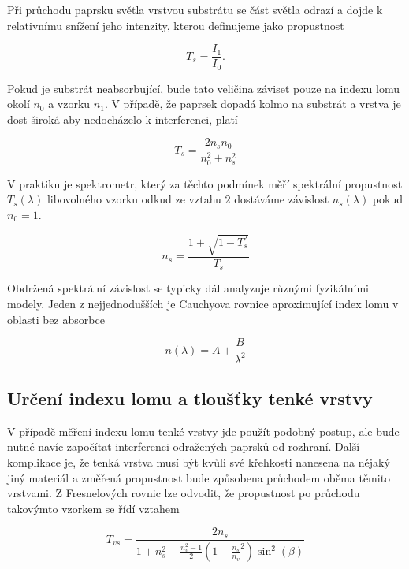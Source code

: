 \documentclass[a4paper,11pt]{article}
\begin{document}
Při průchodu paprsku světla vrstvou substrátu se část světla odrazí a dojde k relativnímu snížení jeho intenzity, kterou definujeme jako propustnost

\begin{equation}
T_s = \frac{I_1}{I_0}.
\end{equation}

Pokud je substrát neabsorbující, bude tato veličina záviset pouze na indexu lomu okolí $ n_0 $ a vzorku $ n_1 $. V případě, že paprsek dopadá kolmo na substrát a vrstva je dost široká aby nedocházelo k interferenci, platí

\begin{equation}
T_s = \frac{2n_s n_0}{n_0^2 + n_s^2}
\end{equation}

V praktiku je spektrometr, který za těchto podmínek měří spektrální propustnost $ T_s(\lambda) $ libovolného vzorku odkud ze vztahu $ 2 $ dostáváme závislost $ n_s(\lambda) $ pokud $ n_0 = 1 $.

\begin{equation}
n_s = \frac{1 + \sqrt{1 - T_s^2} }{T_s}
\end{equation}

Obdržená spektrální závislost se typicky dál analyzuje různými fyzikálními modely. Jeden z nejjednodušších je Cauchyova rovnice aproximující index lomu v oblasti bez absorbce

\begin{equation}
n(\lambda) = A + \frac{B}{\lambda^2}
\end{equation}

\subsection{Určení indexu lomu a tloušťky tenké vrstvy}

V případě měření indexu lomu tenké vrstvy jde použít podobný postup, ale bude nutné navíc započítat interferenci odražených paprsků od rozhraní. Další komplikace je, že tenká vrstva musí být kvůli své křehkosti nanesena na nějaký jiný materiál a změřená propustnost bude způsobena průchodem oběma těmito vrstvami. Z Fresnelových rovnic lze odvodit, že propustnost po průchodu takovýmto vzorkem se řídí vztahem

\begin{equation}
T_{vs} = \frac{2 n_s}{ 1 + n_s^2 + \frac{n_v^2 - 1}{2}(1 - \frac{n_s}{n_v}^2) \sin^2(\beta) }
\end{equation}
\end{document}
